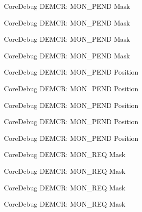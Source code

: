 \begin{DoxyRefList}
\label{deprecated__deprecated000196}%
%
Core\+Debug D\+E\+M\+CR\+: M\+O\+N\+\_\+\+P\+E\+ND Mask 

\label{deprecated__deprecated000338}%
%
Core\+Debug D\+E\+M\+CR\+: M\+O\+N\+\_\+\+P\+E\+ND Mask 

\label{deprecated__deprecated000414}%
%
Core\+Debug D\+E\+M\+CR\+: M\+O\+N\+\_\+\+P\+E\+ND Mask 

\label{deprecated__deprecated000503}%
%
Core\+Debug D\+E\+M\+CR\+: M\+O\+N\+\_\+\+P\+E\+ND Mask  
\item[Member \mbox{\hyperlink{group__CMSIS__CoreDebug_ga1e2f706a59e0d8131279af1c7e152f8d}{Core\+Debug\+\_\+\+D\+E\+M\+C\+R\+\_\+\+M\+O\+N\+\_\+\+P\+E\+N\+D\+\_\+\+Pos}} ]\label{deprecated__deprecated000051}%
%
Core\+Debug D\+E\+M\+CR\+: M\+O\+N\+\_\+\+P\+E\+ND Position 

\label{deprecated__deprecated000195}%
%
Core\+Debug D\+E\+M\+CR\+: M\+O\+N\+\_\+\+P\+E\+ND Position 

\label{deprecated__deprecated000337}%
%
Core\+Debug D\+E\+M\+CR\+: M\+O\+N\+\_\+\+P\+E\+ND Position 

\label{deprecated__deprecated000413}%
%
Core\+Debug D\+E\+M\+CR\+: M\+O\+N\+\_\+\+P\+E\+ND Position 

\label{deprecated__deprecated000502}%
%
Core\+Debug D\+E\+M\+CR\+: M\+O\+N\+\_\+\+P\+E\+ND Position  
\item[Member \mbox{\hyperlink{group__CMSIS__CoreDebug_gae6384cbe8045051186d13ef9cdeace95}{Core\+Debug\+\_\+\+D\+E\+M\+C\+R\+\_\+\+M\+O\+N\+\_\+\+R\+E\+Q\+\_\+\+Msk}} ]\label{deprecated__deprecated000048}%
%
Core\+Debug D\+E\+M\+CR\+: M\+O\+N\+\_\+\+R\+EQ Mask 

\label{deprecated__deprecated000192}%
%
Core\+Debug D\+E\+M\+CR\+: M\+O\+N\+\_\+\+R\+EQ Mask 

\label{deprecated__deprecated000334}%
%
Core\+Debug D\+E\+M\+CR\+: M\+O\+N\+\_\+\+R\+EQ Mask 

\label{deprecated__deprecated000410}%
%
Core\+Debug D\+E\+M\+CR\+: M\+O\+N\+\_\+\+R\+EQ Mask 


\end{DoxyRefList}
